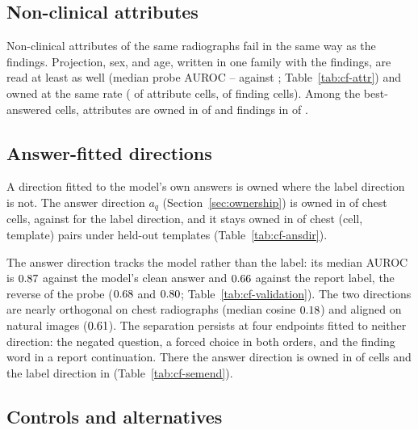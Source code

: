 \subsection{Non-clinical attributes}
\label{sec:attributes}

Non-clinical attributes of the same radiographs fail in the same way as the findings. Projection, sex, and age, written in one family with the findings, are read at least as well (median probe AUROC \cfAttrAurocMin{}--\cfAttrAurocMax{} against \cfAttrClinAuroc{}; Table~\ref{tab:cf-attr}) and owned at the same rate (\cfAttrAllAttrOwned{} of \cfAttrAllAttrN{} attribute cells, \cfAttrAllClinOwned{} of \cfAttrAllClinN{} finding cells). Among the best-answered cells, attributes are owned in \cfStratAttrTopOwned{} of \cfStratAttrTopN{} and findings in \cfStratFindTopOwned{} of \cfStratFindTopN{}.

\subsection{Answer-fitted directions}
\label{sec:ansdir}

A direction fitted to the model's own answers is owned where the label direction is not. The answer direction $a_q$ (Section~\ref{sec:ownership}) is owned in \cfAnsChestOwnedA{} of \cfAnsChestN{} chest cells, against \cfAnsChestOwnedLabel{} for the label direction, and it stays owned in \cfAnsdirtChestKept{} of \cfAnsdirtChestKeptN{} chest (cell, template) pairs under held-out templates (Table~\ref{tab:cf-ansdir}).

The answer direction tracks the model rather than the label: its median AUROC is $0.87$ against the model's clean answer and $0.66$ against the report label, the reverse of the probe ($0.68$ and $0.80$; Table~\ref{tab:cf-validation}). The two directions are nearly orthogonal on chest radiographs (median cosine $0.18$) and aligned on natural images ($0.61$). The separation persists at four endpoints fitted to neither direction: the negated question, a forced choice in both orders, and the finding word in a report continuation. There the answer direction is owned in \cfSemAnswerOwned{} of \cfSemCells{} cells and the label direction in \cfSemLabelOwned{} (Table~\ref{tab:cf-semend}).

\subsection{Controls and alternatives}
\label{sec:controls}
\label{sec:robust-geometry}

